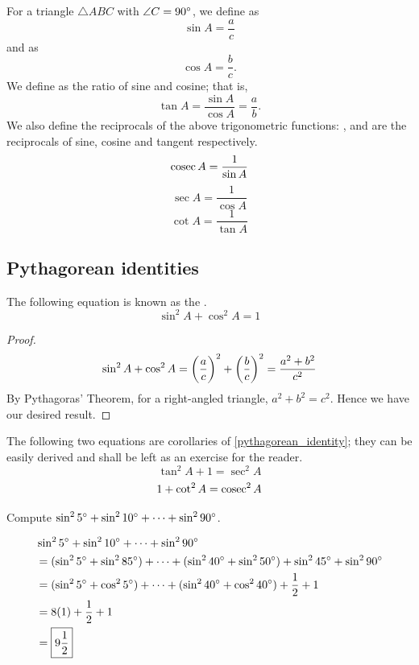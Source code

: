 For a triangle $\triangle ABC$ with $\angle C=90\degree$, we define  as
\begin{equation}
\sin A=\frac{a}{c}
\end{equation}
and  as
\begin{equation}
\cos A=\frac{b}{c}.
\end{equation}
We define  as the ratio of sine and cosine; that is,
\begin{equation}
\tan A=\frac{\sin A}{\cos A}=\frac{a}{b}.
\end{equation}
We also define the reciprocals of the above trigonometric functions: ,  and  are the reciprocals of sine, cosine and tangent respectively.
\begin{equation}
\operatorname{cosec} A=\frac{1}{\sin A}
\end{equation}
\begin{equation}
\sec A=\frac{1}{\cos A}
\end{equation}
\begin{equation}
\cot A=\frac{1}{\tan A}
\end{equation}

\subsection{Pythagorean identities}
The following equation is known as the .
\begin{equation}\label{pythagorean_identity}
\sin^2 A + \cos^2 A = 1
\end{equation}
\begin{proof}
\[ \sin^2A+\cos^2A=\left(\frac{a}{c}\right)^2+\left(\frac{b}{c}\right)^2=\frac{a^2+b^2}{c^2} \]
By Pythagoras' Theorem, for a right-angled triangle, $a^2+b^2=c^2$. Hence we have our desired result.
\end{proof}
The following two equations are corollaries of \cref{pythagorean_identity}; they can be easily derived and shall be left as an exercise for the reader.
\[ \tan^2 A + 1 = \sec^2 A \]
\[ 1 + \cot^2 A = \operatorname{cosec}^2 A \]

\begin{exercise}
Compute $\sin^25\degree+\sin^210\degree+\cdots+\sin^290\degree$.
\end{exercise}
\begin{solution}
\begin{align*}
&\sin^25\degree+\sin^210\degree+\cdots+\sin^290\degree \\
&= (\sin^25\degree+\sin^285\degree) + \cdots + (\sin^240\degree+\sin^250\degree)+\sin^245\degree+\sin^290\degree \\
&= (\sin^25\degree+\cos^25\degree) + \cdots + (\sin^240\degree+\cos^240\degree)+\frac{1}{2}+1 \\
&= 8(1)+\frac{1}{2}+1 \\
&= \boxed{9\frac{1}{2}}
\end{align*}
\end{solution}

